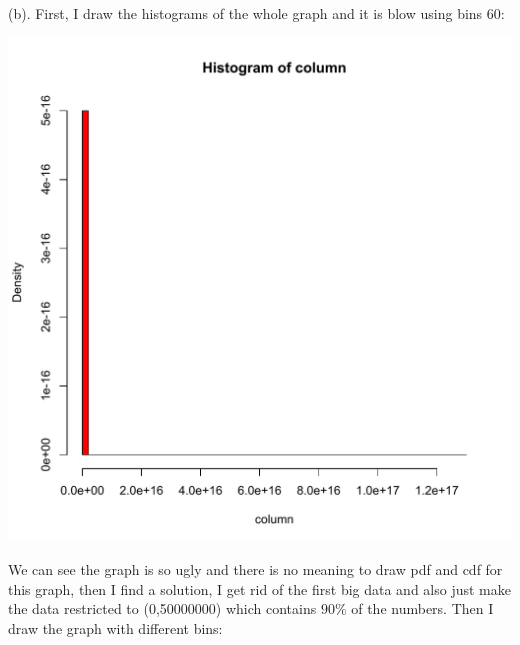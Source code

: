 \documentclass[11pt]{article}
\begin{document}
(b). First, I draw the histograms of the whole graph and it is blow using bins 60: \\
\begin{center}
\includegraphics[scale=0.5]{trace1_1_full.pdf}
\end{center}
We can see the graph is so ugly and there is no meaning to draw pdf and cdf for this graph, then I find a solution, I get rid of the first big data and also just make the data restricted to (0,50000000) which contains $90\%$ of the numbers. Then I draw the graph with different bins: \\
\end{document}
